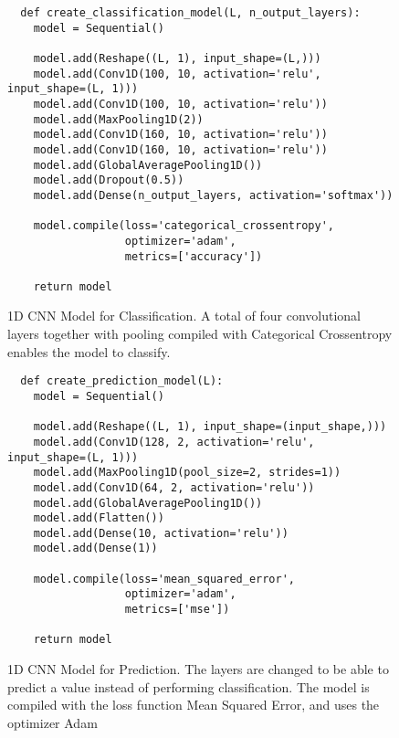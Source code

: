 \begin{figure}[h]
\begin{code}
  \begin{verbatim}
  def create_classification_model(L, n_output_layers):
    model = Sequential()

    model.add(Reshape((L, 1), input_shape=(L,)))
    model.add(Conv1D(100, 10, activation='relu', input_shape=(L, 1)))
    model.add(Conv1D(100, 10, activation='relu'))
    model.add(MaxPooling1D(2))
    model.add(Conv1D(160, 10, activation='relu'))
    model.add(Conv1D(160, 10, activation='relu'))
    model.add(GlobalAveragePooling1D())
    model.add(Dropout(0.5))
    model.add(Dense(n_output_layers, activation='softmax'))

    model.compile(loss='categorical_crossentropy', 
                  optimizer='adam', 
                  metrics=['accuracy'])

    return model
  \end{verbatim}
  \caption{1D CNN Model for Classification. A total of four convolutional layers together with pooling compiled with Categorical Crossentropy enables the model to classify.}
  \label{code:1d_conv_net_classifier}
\end{code}
\end{figure}

\begin{figure}[h]
\begin{code}
  \begin{verbatim}
  def create_prediction_model(L):
    model = Sequential()

    model.add(Reshape((L, 1), input_shape=(input_shape,)))
    model.add(Conv1D(128, 2, activation='relu', input_shape=(L, 1)))
    model.add(MaxPooling1D(pool_size=2, strides=1))
    model.add(Conv1D(64, 2, activation='relu'))
    model.add(GlobalAveragePooling1D())
    model.add(Flatten())
    model.add(Dense(10, activation='relu'))
    model.add(Dense(1))
    
    model.compile(loss='mean_squared_error', 
                  optimizer='adam', 
                  metrics=['mse'])

    return model
  \end{verbatim}
  \caption{1D CNN Model for Prediction. The layers are changed to be able to predict a value instead of performing classification. The model is compiled with the loss function Mean Squared Error, and uses the optimizer Adam}
  \label{code:1d_conv_net_predictor}
\end{code}
\end{figure}